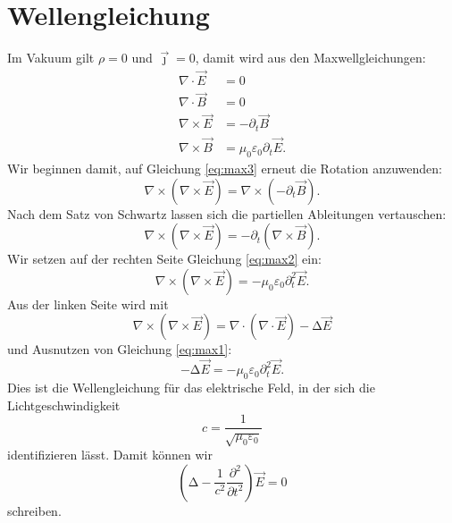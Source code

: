 \documentclass{scrartcl}
\begin{document}
\section{Wellengleichung}
Im Vakuum gilt $\rho=0$ und $\vec{\jmath}=0$,
damit wird aus den Maxwellgleichungen:
\begin{align}
  \nabla \cdot  \vec{E} &= 0 \label{eq:max1} \\
  \nabla \cdot  \vec{B} &= 0 \label{eq:max2} \\
  \nabla \times \vec{E} &= - \partial_t \vec{B} \label{eq:max3} \\
  \nabla \times \vec{B} &= \mu_0 \varepsilon_0 \partial_t \vec{E} . \label{eq:max4}
\end{align}
Wir beginnen damit, auf Gleichung \eqref{eq:max3} erneut die Rotation anzuwenden:
\begin{equation}
  \nabla \times \left( \nabla \times \vec{E} \right) = \nabla \times \left( - \partial_t \vec{B} \right) .
\end{equation}
Nach dem Satz von Schwartz lassen sich die partiellen Ableitungen vertauschen:
\begin{equation}
  \nabla \times \left( \nabla \times \vec{E} \right) = - \partial_t \left( \nabla \times \vec{B} \right) .
\end{equation}
Wir setzen auf der rechten Seite Gleichung \eqref{eq:max2} ein:
\begin{equation}
  \nabla \times \left( \nabla \times \vec{E} \right) = - \mu_0 \varepsilon_0 \partial_t^2 \vec{E} .
\end{equation}
Aus der linken Seite wird mit
\begin{equation}
  \nabla \times \left( \nabla \times \vec{E} \right) = \nabla \cdot \left( \nabla \cdot \vec{E} \right) - \increment \vec{E}
\end{equation}
und Ausnutzen von Gleichung \eqref{eq:max1}:
\begin{equation}
  - \increment\vec{E} = -\mu_0 \varepsilon_0 \partial_t^2 \vec{E} .
\end{equation}
Dies ist die Wellengleichung für das elektrische Feld, in der sich die Lichtgeschwindigkeit
\begin{equation}
  c = \frac{1}{\sqrt{\mu_0 \varepsilon_0}}
\end{equation}
identifizieren lässt.
Damit können wir
\begin{equation}
  \left(\increment - \frac{1}{c^2} \frac{\partial^2}{\partial t^2} \right) \vec{E} = 0
\end{equation}
schreiben.
\end{document}
